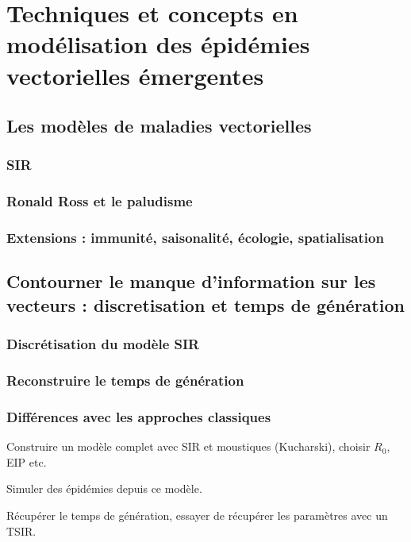 \chapter{Techniques et concepts en modélisation des épidémies vectorielles émergentes}

\section{Les modèles de maladies vectorielles}

\subsection{SIR}

\subsection{Ronald Ross et le paludisme}

\subsection{Extensions : immunité, saisonalité, écologie, spatialisation}

\section{Contourner le manque d'information sur les vecteurs : discretisation et temps de génération}

\subsection{Discrétisation du modèle SIR}

\subsection{Reconstruire le temps de génération}

\subsection{Différences avec les approches classiques}

Construire un modèle complet avec SIR et moustiques (Kucharski), choisir $R_0$, EIP etc.

Simuler des épidémies depuis ce modèle.

Récupérer le temps de génération, essayer de récupérer les paramètres avec un TSIR.

